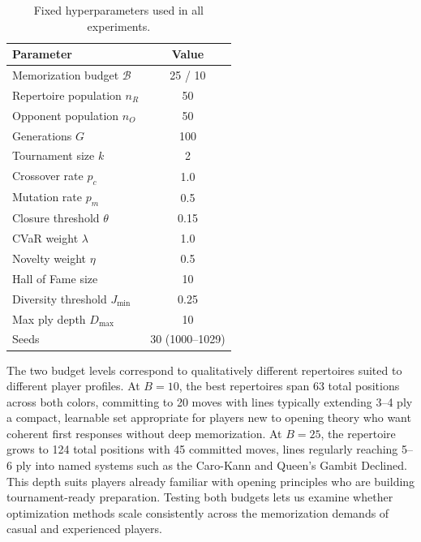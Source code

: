 \documentclass[conference]{IEEEtran}
\begin{document}
\begin{table}[!ht] %
  \centering
  \caption{Fixed hyperparameters used in all experiments.}
  \label{tab:hyperparams}
  \renewcommand{\arraystretch}{1.10}
  \setlength{\tabcolsep}{5pt}
  \begin{tabular}{lc}
    \toprule
    \textbf{Parameter} & \textbf{Value} \\
    \midrule
    Memorization budget $\mathcal{B}$           & 25 / 10 \\
    Repertoire population $n_R$    & 50 \\
    Opponent population $n_O$      & 50 \\
    Generations $G$                & 100 \\
    Tournament size $k$            & 2 \\
    Crossover rate $p_c$           & 1.0 \\
    Mutation rate $p_m$            & 0.5 \\
    Closure threshold $\theta$     & 0.15 \\
    CVaR weight $\lambda$          & 1.0 \\
    Novelty weight $\eta$          & 0.5 \\
    Hall of Fame size              & 10 \\
    Diversity threshold $J_{\min}$ & 0.25 \\
    Max ply depth $D_{\max}$       & 10 \\
    Seeds                          & 30 (1000--1029) \\
    \bottomrule
  \end{tabular}
\end{table}

The two budget levels correspond to qualitatively different repertoires suited to different player profiles.
 At $B = 10$, the best repertoires span 63 total positions across both colors, committing to 20 moves with
  lines typically extending 3--4 ply a compact, learnable set appropriate for players new to opening theory
   who want coherent first responses without deep memorization. At $B = 25$, the repertoire grows to 124 total
    positions with 45 committed moves, lines regularly reaching 5--6 ply into named systems such as the Caro-Kann
     and Queen's Gambit Declined. This depth suits players already familiar with opening principles who are building
      tournament-ready preparation. Testing both budgets lets us examine whether optimization methods scale consistently
       across the memorization demands of casual and experienced players.
\end{document}
